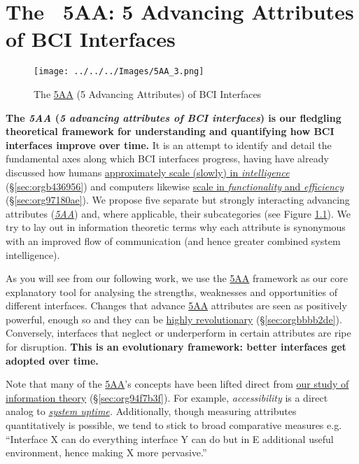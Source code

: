 \documentclass[logo,bsc,singlespacing,parskip]{infthesis}
\begin{document}
\chapter{The ~5AA: 5 Advancing Attributes of BCI Interfaces}
\label{sec:org7f79682}
\begin{figure}[H]
\centering
\texttt{[image: ../../../Images/5AA\_3.png]}
\caption{\label{fig:5AA}The \hyperref[org2644eb5]{5AA} (5 Advancing Attributes) of BCI Interfaces}
\end{figure}

\textbf{The \emph{\label{org2644eb5}5AA} (\emph{5 advancing attributes of BCI interfaces}) is our fledgling theoretical framework for understanding and quantifying how BCI interfaces improve over time.}
It is an attempt to identify and detail the fundamental axes along which BCI interfaces progress, having have already discussed how humans \hyperref[sec:orgb436956]{approximately scale (slowly) in \emph{intelligence}} (\S \ref{sec:orgb436956}) and computers likewise \hyperref[sec:org97180ae]{scale in \emph{functionality} and \emph{efficiency}} (\S \ref{sec:org97180ae}).
We propose five separate but strongly interacting advancing attributes (\emph{\hyperref[org2644eb5]{5AA}}) and, where applicable, their subcategories (see Figure \ref{fig:5AA}).
We try to lay out in information theoretic terms why each attribute is synonymous with an improved flow of communication (and hence greater combined system intelligence).

As you will see from our following work, we use the \hyperref[org2644eb5]{5AA} framework as our core explanatory tool for analysing the strengths, weaknesses and opportunities of different interfaces.
Changes that advance \hyperref[org2644eb5]{5AA} attributes are seen as positively powerful, enough so and they can be \hyperref[sec:orgbbbb2de]{highly revolutionary} (\S \ref{sec:orgbbbb2de}).
Conversely, interfaces that neglect or underperform in certain attributes are ripe for disruption.
\textbf{This is an evolutionary framework: better interfaces get adopted over time.}

Note that many of the \hyperref[org2644eb5]{5AA}'s concepts have been lifted direct from \hyperref[sec:org94f7b3f]{our study of information theory} (\S \ref{sec:org94f7b3f}).
For example, \emph{accessibility} is a direct analog to \emph{\hyperref[org1125b77]{system uptime}.}
Additionally, though measuring attributes quantitatively is possible, we tend to stick to broad comparative measures e.g. ``Interface X can do everything interface Y can do but in E additional useful environment, hence making X more pervasive.''
\end{document}
